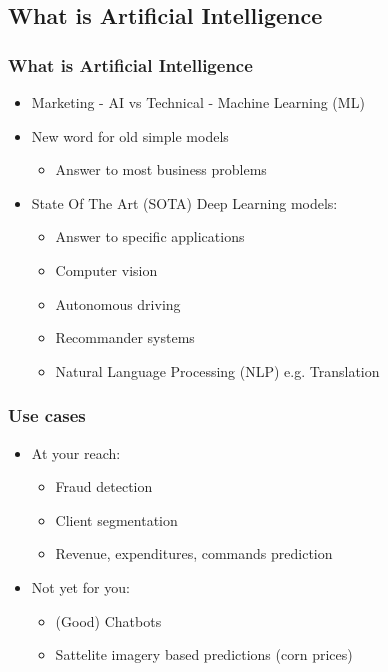 \subsection{What is Artificial Intelligence}
\begin{frame}\frametitle{What is Artificial Intelligence}
   \begin{itemize}
      \item Marketing - AI vs Technical - Machine Learning (ML)
      \item New word for old simple models
      \begin{itemize}
         \item Answer to most business problems
      \end{itemize}
      \item State Of The Art (SOTA) Deep Learning models:
      \begin{itemize}
         \item Answer to specific applications
         \item Computer vision
         \item Autonomous driving
         \item Recommander systems
         \item Natural Language Processing (NLP) e.g. Translation
      \end{itemize}
   \end{itemize}
\end{frame}


\begin{frame}\frametitle{Use cases}
   \begin{itemize}
      \item At your reach:
      \begin{itemize}
         \item Fraud detection
         \item Client segmentation
         \item Revenue, expenditures, commands prediction
      \end{itemize}
      \item Not yet for you:
      \begin{itemize}
         \item (Good) Chatbots
         \item Sattelite imagery based predictions (corn prices)
      \end{itemize}
   \end{itemize}
\end{frame}




